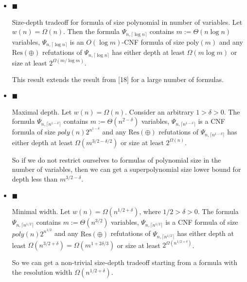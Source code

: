 \begin{itemize}


\item 
$\blacksquare$ 


Size-depth tradeoff for formula of size polynomial in number of variables.
Let $w(n)=\Omega(n)$.
Then the formula $\Psi_{n,\lceil\log n\rceil}$ contains $m:=\Theta(n\log n)$
variables, $\Psi_{n,\lceil\log n\rceil}$ is an $O(\log m)$-CNF formula of size
$\mathrm{poly}(m)$ and any $\mathrm{Res}(\oplus)$ refutations of $\Psi_{n,\lceil\log n\rceil}$ has
either depth at least $\Omega(m\log m)$ or size at least $2^{\Omega(m/\log m)}$.\par




This result extends the result from [18] for a large number of formulas.\par





\item 
$\blacksquare$ 


Maximal depth.
Let $w(n)=\Omega(n)$. Consider an arbitrary $1>\delta>0$.
The formula $\Psi_{n,\lceil n^{1-\delta}\rceil}$ contains $m:=\Theta(n^{2-\delta})$
variables, $\Psi_{n,\lceil n^{1-\delta}\rceil}$ is a CNF formula of size
$poly(n)2^{n^{1-\delta}}$ and any $\mathrm{Res}(\oplus)$ refutations of
$\Psi_{n,\lceil n^{1-\delta}\rceil}$ has either depth at least $\Omega(m^{3/2-\delta/2})$
or size at least $2^{\Omega(n)}$.\par




So if we do not restrict ourselves to formulas of polynomial size in the number of variables,
then we can get a superpolynomial size lower bound for depth less than $m^{3/2-\delta}$.\par





\item 
$\blacksquare$ 


Minimal width.
Let $w(n)=\Omega\left(n^{1/2+\delta}\right)$, where $1/2>\delta>0$.
The formula $\Psi_{n,\lceil n^{1/2}\rceil}$ contains $m:=\Theta(n^{3/2})$ variables,
$\Psi_{n,\lceil n^{1/2}\rceil}$ is a CNF formula of size $poly(n)2^{n^{1/2}}$
and any $\mathrm{Res}(\oplus)$ refutations of $\Psi_{n,\lceil n^{1/2}\rceil}$ has either
depth at least $\Omega\left(n^{3/2+\delta}\right)=\Omega\left(m^{1+2\delta/3}\right)$ or size at least
$2^{\Omega\left(n^{1/2+\delta}\right)}$.\par




So we can get a non-trivial size-depth tradeoff starting from a formula with the resolution width
$\Omega\left(n^{1/2+\delta}\right)$.\par





\end{itemize}


